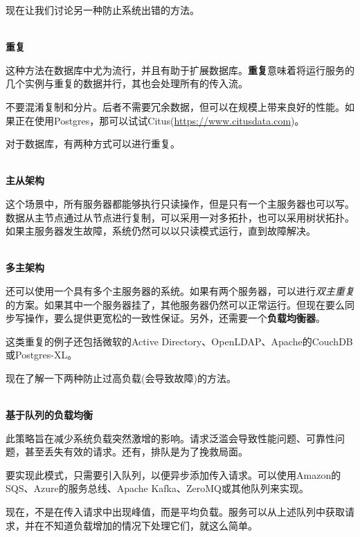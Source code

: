现在让我们讨论另一种防止系统出错的方法。

\hspace*{\fill} \\ %
\noindent
\textbf{重复}

这种方法在数据库中尤为流行，并且有助于扩展数据库。\textbf{重复}意味着将运行服务的几个实例与重复的数据并行，其也会处理所有的传入流。

\begin{tcolorbox}[colback=blue!5!white,colframe=blue!75!black, title=Note]
\hspace*{0.7cm}不要混淆复制和分片。后者不需要冗余数据，但可以在规模上带来良好的性能。如果正在使用Postgres，那可以试试Citus(\url{https://www.citusdata.com})。
\end{tcolorbox}

对于数据库，有两种方式可以进行重复。

\hspace*{\fill} \\ %
\noindent
\textbf{主从架构}

这个场景中，所有服务器都能够执行只读操作，但是只有一个主服务器也可以写。数据从主节点通过从节点进行复制，可以采用一对多拓扑，也可以采用树状拓扑。如果主服务器发生故障，系统仍然可以以只读模式运行，直到故障解决。

\hspace*{\fill} \\ %
\noindent
\textbf{多主架构}

还可以使用一个具有多个主服务器的系统。如果有两个服务器，可以进行\textit{双主重复}的方案。如果其中一个服务器挂了，其他服务器仍然可以正常运行。但现在要么同步写操作，要么提供更宽松的一致性保证。另外，还需要一个\textbf{负载均衡器}。

这类重复的例子还包括微软的Active Directory、OpenLDAP、Apache的CouchDB或Postgres-XL。

现在了解一下两种防止过高负载(会导致故障)的方法。

\hspace*{\fill} \\ %
\noindent
\textbf{基于队列的负载均衡}

此策略旨在减少系统负载突然激增的影响。请求泛滥会导致性能问题、可靠性问题，甚至丢失有效的请求。还有，排队是为了挽救局面。

要实现此模式，只需要引入队列，以便异步添加传入请求。可以使用Amazon的SQS、Azure的服务总线、Apache Kafka、ZeroMQ或其他队列来实现。

现在，不是在传入请求中出现峰值，而是平均负载。服务可以从上述队列中获取请求，并在不知道负载增加的情况下处理它们，就这么简单。

